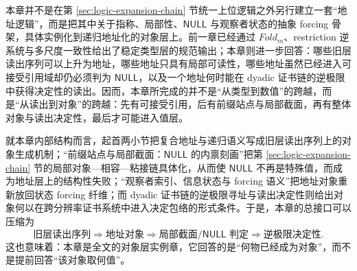 本章并不是在第 \ref{sec:logic-expansion-chain} 节统一上位逻辑之外另行建立一套“地址逻辑”，而是把其中关于指称、局部性、\(\mathsf{NULL}\) 与观察者状态的抽象 forcing 骨架，具体实例化到递归地址化的对象层上。前一章已经通过 \(Fold_m\)、restriction 逆系统与多尺度一致性给出了稳定类型层的规范输出；本章则进一步回答：哪些旧层读出序列可以上升为地址，哪些地址只具有局部可读性，哪些地址虽然已经进入可接受引用域却仍必须判为 \(\mathsf{NULL}\)，以及一个地址何时能在 dyadic 证书链的逆极限中获得决定性的读出。因而，本章所完成的并不是“从类型到数值”的跨越，而是“从读出到对象”的跨越：先有可接受引用，后有前缀站点与局部截面，再有整体对象与读出决定性，最后才可能进入值层。

就本章内部结构而言，起首两小节把复合地址与递归语义写成旧层读出序列上的对象生成机制；“前缀站点与局部截面：\(\mathsf{NULL}\) 的内禀刻画”把第 \ref{sec:logic-expansion-chain} 节的局部对象—相容—粘接链具体化，从而使 \(\mathsf{NULL}\) 不再是特殊值，而成为地址层上的结构性失败；“观察者索引、信息状态与 forcing 语义”把地址对象重新放回状态 forcing 纤维；而 dyadic 证书链的逆极限寻址与读出决定性则给出对象何以在跨分辨率证书系统中进入决定包络的形式条件。于是，本章的总接口可以压缩为
\[
\text{旧层读出序列}
\Longrightarrow
\text{地址对象}
\Longrightarrow
\text{局部截面/\(\mathsf{NULL}\) 判定}
\Longrightarrow
\text{逆极限决定性}.
\]
这也意味着：本章是全文的对象层实例章，它回答的是“何物已经成为对象”，而不是提前回答“该对象取何值”。
